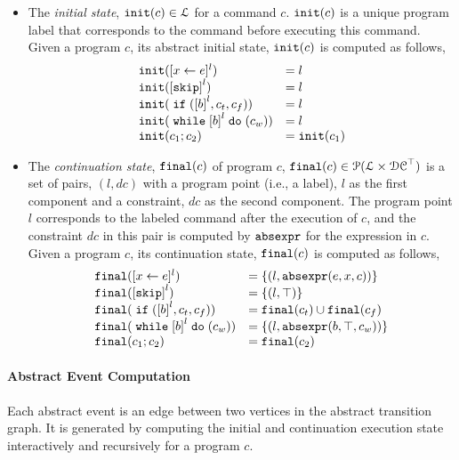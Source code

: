%
\begin{itemize}
 \item The \emph{initial state}, $\mathtt{init}(c) \in \mathcal{L}$
 for a command $c$.
 $\mathtt{init}(c)$ is a unique program label that corresponds to the command before executing this command. 
\\
Given a program $c$, its abstract initial state, $\mathtt{init}(c)$ is computed as follows,
%
\[
 \begin{array}{ll}
 \absinit(\clabel{\assign{x}{\expr}}{}^l) & = l \\
 \absinit(\clabel{\eskip}^{l}) & = l \\
 \absinit(\eif (\clabel{\bexpr}^l, c_t, c_f)) & = l \\
 \absinit(\ewhile \clabel{\bexpr}^l \edo (c_w)) & = l \\
 \absinit(c_1 ; c_2) & = \absinit(c_1) \\
 \end{array}
 \]
%
%
\item The \emph{continuation state}, $\mathtt{final}(c)$ of program $c$, 
$\mathtt{final}(c) \in \mathcal{P}(\mathcal{L} \times \mathcal{DC}^{\top})$
is a set of pairs, $(l, dc)$ with a
program point (i.e., a label), $l$ as the first component and a constraint, 
$dc$ as the second component.
The program point $l$ corresponds to the labeled command after the execution of $c$,
and the constraint $dc$ in this pair is computed by $\mathtt{abs}{\mathtt{expr}}$ for the expression in $c$.
\\
Given a program $c$, its continuation state, $\mathtt{final}(c)$ is computed as follows,
 \[
 \begin{array}{ll}
 \absfinal(\clabel{\assign{x}{\expr}}{}^l) & = \{(l, \absexpr(\expr, x, c))\} \\
 \absfinal(\clabel{\eskip}^{l}) 
 & = \{(l, \top)\} \\
 \absfinal(\eif (\clabel{\bexpr}^l, c_t, c_f)) & = \absfinal(c_t) \cup \absfinal(c_f) \\
 \absfinal(\ewhile \clabel{\bexpr}^l \edo (c_w)) & = \{(l, \absexpr(\bexpr, \top, c_w))\} \\
 \absfinal(c_1 ; c_2) & = \absfinal(c_2) \\
 \end{array}
 \]
\end{itemize}
 \paragraph{Abstract Event Computation} Each abstract event is an edge between two vertices in the abstract transition graph.
 It is generated by computing the initial and continuation execution state interactively and recursively for a program $c$.
 

